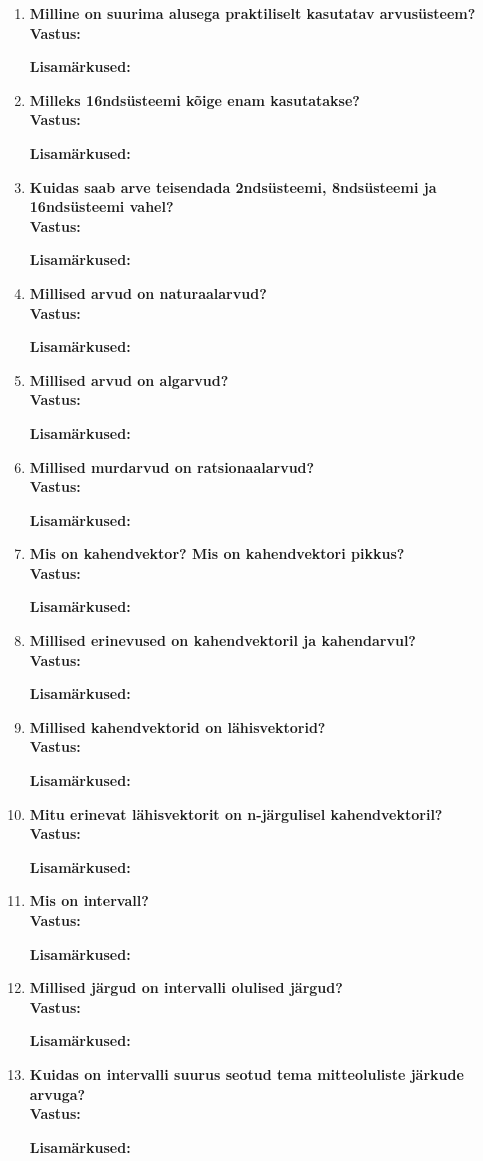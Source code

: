\documentclass[a4paper,12pt]{article}
\makeatletter
\newenvironment{question}[1]{%
  \item \textbf{#1} \vspace{0.5em} \\ %
  \textbf{Vastus:} \vspace{0.25em} \\ %
  \def\@lisamarkused{} %
}{%
  \if\relax\detokenize\expandafter{\@lisamarkused}\relax %
  \else
    \vspace{0.5em} %
    \textbf{Lisamärkused:} \\ %
    \@lisamarkused %
  \fi
  \vspace{1em} %
}
\makeatother
\begin{document}
\begin{enumerate}[left=0pt]
\begin{question}{Milline on suurima alusega praktiliselt kasutatav arvusüsteem?}
\end{question}

\begin{question}{Milleks 16ndsüsteemi kõige enam kasutatakse?}
\end{question}

\begin{question}{Kuidas saab arve teisendada 2ndsüsteemi, 8ndsüsteemi ja 16ndsüsteemi vahel?}
\end{question}

\begin{question}{Millised arvud on naturaalarvud?}
\end{question}

\begin{question}{Millised arvud on algarvud?}
\end{question}

\begin{question}{Millised murdarvud on ratsionaalarvud?}
\end{question}

\begin{question}{Mis on kahendvektor? Mis on kahendvektori pikkus?}
\end{question}

\begin{question}{Millised erinevused on kahendvektoril ja kahendarvul?}
\end{question}

\begin{question}{Millised kahendvektorid on lähisvektorid?}
\end{question}

\begin{question}{Mitu erinevat lähisvektorit on n-järgulisel kahendvektoril?}
\end{question}

\begin{question}{Mis on intervall?}
\end{question}

\begin{question}{Millised järgud on intervalli olulised järgud?}
\end{question}

\begin{question}{Kuidas on intervalli suurus seotud tema mitteoluliste järkude arvuga?}
\end{question}


\end{enumerate}
\end{document}
